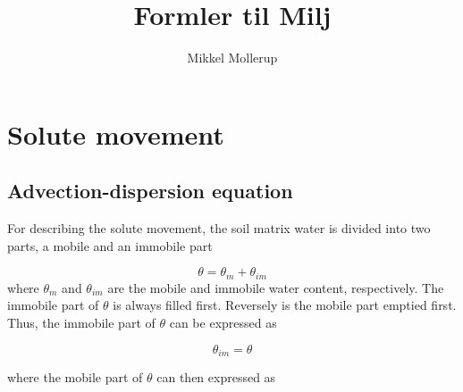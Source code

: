 \documentclass{report}
\begin{document}
%
%


\title{Formler til Milj\ostyrrelsen}

%
%

\author{Mikkel Mollerup}



\chapter{Solute movement}

\section{Advection-dispersion equation}

For describing the solute movement, the soil matrix water is divided
into two parts, a mobile and an immobile part

\begin{equation}
\theta= \theta_{m} + \theta_{im}
\end{equation}
%
where $\theta_{m}$ and $\theta_{im}$ are the mobile and immobile
water content, respectively. The immobile part of $\theta$ is always
filled first. Reversely is the mobile part emptied first. Thus, the
immobile part of $\theta$ can be expressed as


\begin{equation}
\theta_{im}= \theta
\end{equation}

%
where the mobile part of $\theta$ can then expressed as
%
\end{document}
